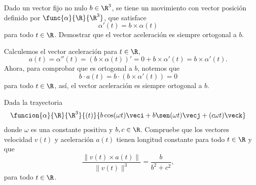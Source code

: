 \documentclass[a4,11pt]{aleph-examen}
\begin{document}
\begin{preguntas}
\item 
    Dado un  vector fijo no nulo $b\in\R^3$, se tiene un movimiento con vector posición definido por $\func{\alpha}{\R}{\R^3}$, que satisface
    \[
        \alpha'(t) = b\times \alpha(t)
    \]
    para todo $t\in\R$. Demostrar que el vector aceleración es siempre ortogonal a $b$.

\begin{respuesta}
    Calculemos el vector aceleración para $t\in\R$,
    \[
        a(t)=\alpha''(t)=(b\times \alpha(t))'=0+b\times \alpha'(t)=b\times \alpha'(t).
    \]
    Ahora, para comprobar que es ortogonal a $b$, notemos que
    \[
        b\cdot a(t) = b\cdot (b\times \alpha'(t)) = 0
    \]
    para todo $t\in\R$, así, el vector aceleración es siempre ortogonal a $b$.
\end{respuesta}





\item
    Dada la trayectoria
	\[
        \funcion{\alpha}{\R}{\R^3}{(t)}{b\cos(\omega t)\veci+b\sen(\omega t)\vecj +(c\omega t)\veck}
    \]
    donde $\omega$ es una constante positiva y $b,c\in \R$. Compruebe que los vectores velocidad $v(t)$ y aceleración $a(t)$ tienen longitud constante para todo $t\in \R$ y que
    \[
        \frac{\|v(t)\times a(t)\|}{\|v(t)\|^3}=\frac{b}{b^2+c^2},
    \]
    para todo $t\in \R$.
    
	

\end{preguntas}
\end{document}
